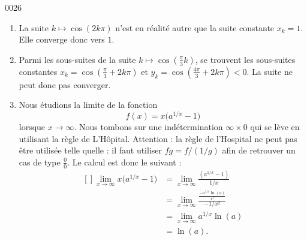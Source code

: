 
\begin{corrige}{0026}

\begin{enumerate}
\item La suite $k\mapsto \cos(2k\pi)$ n'est en réalité autre que la suite constante $x_k=1$. Elle converge donc vers $1$.
\item Parmi les sous-suites de la suite $k\mapsto\cos(\frac{ \pi }{ 3 }k)$, se trouvent les sous-suites constantes $x_k=\cos(\frac{ \pi }{ 3 }+2k\pi)$ et $y_k=\cos(\frac{ 4\pi }{ 3 }+2k\pi)<0$. La suite ne peut donc pas converger.
\item Nous étudions la limite de la fonction
\begin{equation}
	f(x)=x\big( a^{1/x}-1 \big)
\end{equation}
lorsque $x\to\infty$. Nous tombons sur une indétermination $\infty\times 0$ qui se lève en utilisant la règle de L'Hôpital. Attention : la règle de l'Hospital ne peut pas être utilisée telle quelle : il faut utiliser $fg=f/(1/g)$ afin de retrouver un cas de type $\frac{ 0 }{ 0 }$. Le calcul est donc le suivant :
\begin{equation}
	\begin{aligned}[]
		\lim_{x\to\infty} x\big( a^{1/x}-1 \big)	&=\lim_{x\to\infty}\frac{ (a^{1/x}-1) }{ 1/x }\\
				&=\lim_{x\to\infty}\frac{ \frac{ -a^{1/x}\ln(a) }{ x^2 } }{ -1/x^2 }\\
				&=\lim_{x\to\infty}a^{1/x}\ln(a)\\
				&=\ln(a).
	\end{aligned}
\end{equation}

\end{enumerate}


\end{corrige}
